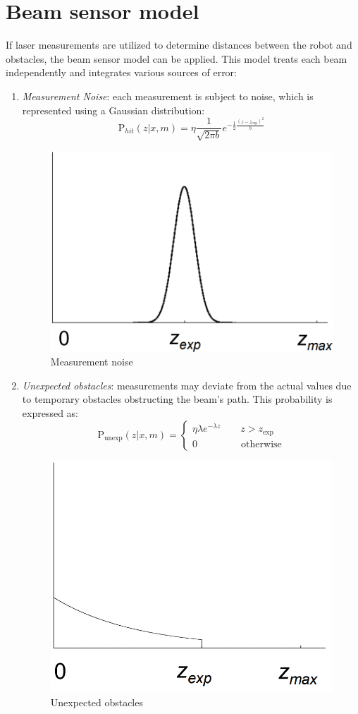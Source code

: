 \section{Beam sensor model}

If laser measurements are utilized to determine distances between the robot and obstacles, the beam sensor model can be applied. 
This model treats each beam independently and integrates various sources of error:
\begin{enumerate}
    \item \textit{Measurement Noise}: each measurement is subject to noise, which is represented using a Gaussian distribution:
        \[\text{P}_{hit}(z|x,m)=\eta \dfrac{1}{\sqrt{2\pi b}}e^{-\frac{1}{2}\frac{{\left(z-z_{\text{exp}}\right)}^2}{b}}\]
        \begin{figure}[H]
            \centering
            \includegraphics[width=0.4\linewidth]{images/mn.png}
            \caption{Measurement noise}
        \end{figure}
    \item \textit{Unexpected obstacles}: measurements may deviate from the actual values due to temporary obstacles obstructing the beam's path. 
        This probability is expressed as:
        \[\text{P}_{\text{unexp}}(z|x,m)=\begin{cases}
            \eta\lambda e^{-\lambda z} \qquad z>z_{\text{exp}} \\
            0 \qquad\qquad\:\: \text{otherwise}
        \end{cases}\]
        \begin{figure}[H]
            \centering
            \includegraphics[width=0.4\linewidth]{images/uo.png}
            \caption{Unexpected obstacles}

\end{figure}
\end{enumerate}
